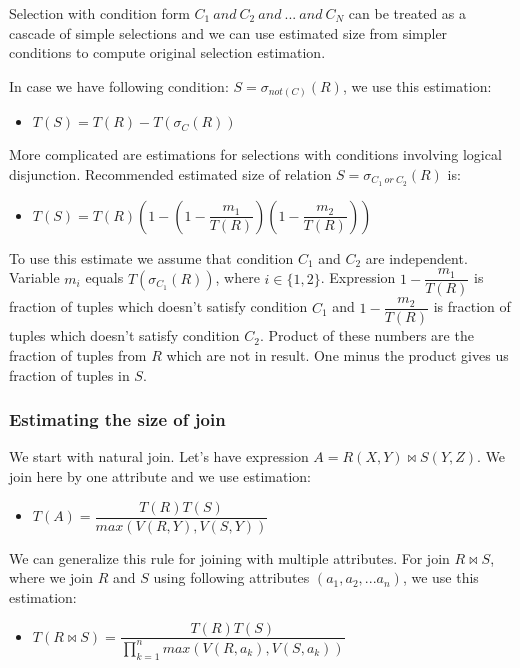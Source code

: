 Selection with condition form $C_1~and~C_2~and~...~and~C_N$ can be treated as a cascade of simple selections and we can use estimated size from simpler conditions to compute original selection estimation.

In case we have following condition: $S=\sigma_{not(C)}(R)$, we use this estimation:
\begin{itemize}
\item $T(S)=T(R)-T(\sigma_C(R))$
\end{itemize}

More complicated are estimations for selections with conditions involving logical disjunction. Recommended estimated size of relation $S=\sigma_{C_1~or~C_2}(R)$ is:

\begin{itemize}
\item $T(S)=T(R)(1-(1-\dfrac{m_1}{T(R)})(1-\dfrac{m_2}{T(R)}))$
\end{itemize}

To use this estimate we assume that condition $C_1$ and $C_2$ are independent.
Variable $m_i$ equals $T(\sigma_{C_1}(R))$, where $i\in\{1,2\}$. Expression $1-\dfrac{m_1}{T(R)}$ is fraction of tuples which doesn't satisfy condition $C_1$ and $1-\dfrac{m_2}{T(R)}$ is fraction of tuples which doesn't satisfy condition $C_2$. Product of these numbers are the fraction of tuples from $R$ which are not in result. One minus the product gives us fraction of tuples in $S$.

\subsubsection{Estimating the size of join}
\label{join}
We start with natural join. Let's have expression $A=R(X,Y)\Join S(Y,Z)$. We join here by one attribute and we use estimation:

\begin{itemize}
\item $T(A)=\dfrac{T(R)T(S)}{max(V(R,Y),V(S,Y))}$
\end{itemize}

We can generalize this rule for joining with multiple attributes. For join $R\Join S$, where we join $R$ and $S$ using following attributes $(a_1,a_2,...a_n)$, we use this estimation:

\begin{itemize}
\item $T(R\Join S)=\dfrac{T(R)T(S)}{\prod_{k=1}^{n}{max(V(R,a_k),V(S,a_k))}}$
\end{itemize}

